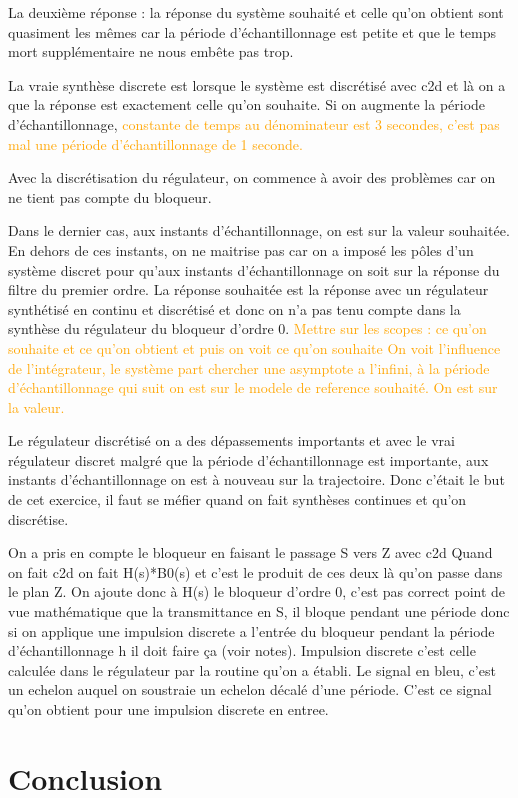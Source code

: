 La deuxième réponse : la réponse du système souhaité et celle qu'on obtient sont quasiment les mêmes car la période d'échantillonnage est petite et que le temps mort supplémentaire ne nous embête pas trop.

La vraie synthèse discrete est lorsque le système est discrétisé avec c2d et là on a que la réponse est exactement celle qu'on souhaite.
Si on augmente la période d'échantillonnage, \textcolor{orange}{constante de temps au dénominateur est 3 secondes, c'est pas mal une période d'échantillonnage de 1 seconde.}

Avec la discrétisation du régulateur, on commence à avoir des problèmes car on ne tient pas compte du bloqueur.

Dans le dernier cas, aux instants d'échantillonnage, on est sur la valeur souhaitée. En dehors de ces instants, on ne maitrise pas car on a imposé les pôles d'un système discret pour qu'aux instants d'échantillonnage on soit sur la réponse du filtre du premier ordre.
La réponse souhaitée est la réponse avec un régulateur synthétisé en continu et discrétisé et donc on n'a pas tenu compte dans la synthèse du régulateur du bloqueur d'ordre 0.
\textcolor{orange}{Mettre sur les scopes : ce qu'on souhaite et ce qu'on obtient et puis on voit ce qu'on souhaite
On voit l'influence de l'intégrateur, le système part chercher une asymptote a l'infini, à la période d'échantillonnage qui suit on est sur le modele de reference souhaité. On est sur la valeur.}

Le régulateur discrétisé on a des dépassements importants et avec le vrai régulateur discret malgré que la période d'échantillonnage est importante, aux instants d'échantillonnage on est à nouveau sur la trajectoire.
Donc c'était le but de cet exercice, il faut se méfier quand on fait synthèses continues et qu'on discrétise.

On a pris en compte le bloqueur en faisant le passage S vers Z avec c2d
Quand on fait c2d on fait H(s)*B0(s) et c'est le produit de ces deux là qu'on passe dans le plan Z.
On ajoute donc à H(s) le bloqueur d'ordre 0, c'est pas correct point de vue mathématique que la transmittance en S, il bloque pendant une période donc si on applique une impulsion discrete a l'entrée du bloqueur pendant la période d'échantillonnage h il doit faire ça (voir notes).
Impulsion discrete c'est celle calculée dans le régulateur par la routine qu'on a établi.
Le signal en bleu, c'est un echelon auquel on soustraie un echelon décalé d'une période.
C'est ce signal qu'on obtient pour une impulsion discrete en entree.

\section{Conclusion}

